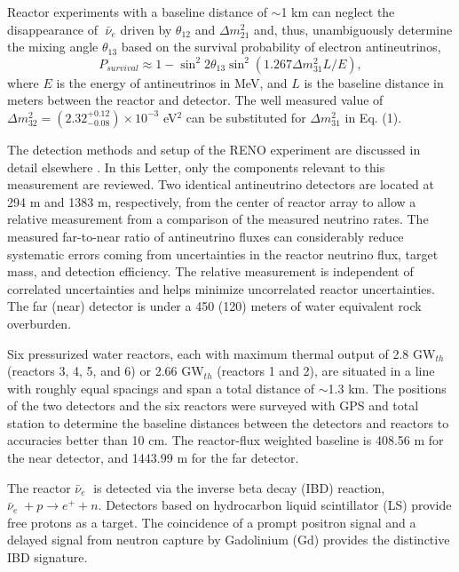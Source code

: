 \documentclass[aps,prl,twocolumn,superscriptaddress,showpacs]{revtex4-1}
\begin{document}
Reactor experiments with a baseline distance of $\sim$1 km can neglect the disappearance of $\bar{\nu}_e$ driven by $\theta_{12}$ and $\Delta m_{21}^2$ and, thus, unambiguously determine the mixing angle $\theta_{13}$ based on the survival probability of electron antineutrinos, 
\begin{equation}
 P_{survival} \approx 1- \sin^2 2 \theta_{13} \sin^2(1.267 \Delta m_{31}^2 L/E),           
\end{equation}
where $E$ is the energy of antineutrinos in MeV, and $L$ is the baseline distance in meters between the reactor and detector. The well measured value of $\Delta m_{32}^2 = (2.32_{-0.08}^{+0.12})\times 10^{-3}$ eV$^2$ \cite{ref_16} can be substituted for $\Delta m_{31}^2$ in Eq. (1). 


The detection methods and setup of the RENO experiment are discussed in detail elsewhere \cite{ref_17}. In this Letter, only the components relevant to this measurement are reviewed. Two identical antineutrino detectors are located at 294 m and 1383 m, respectively, from the center of reactor array to allow a relative measurement from a comparison of the measured neutrino rates. The measured far-to-near ratio of antineutrino fluxes can considerably reduce systematic errors coming from uncertainties in the reactor neutrino flux, target mass, and detection efficiency. The relative measurement is independent of correlated uncertainties and helps minimize uncorrelated reactor uncertainties. The far (near) detector is under a 450 (120) meters of water equivalent rock overburden.


Six pressurized water reactors, each with maximum thermal output of 2.8 GW$_{th}$ (reactors 3, 4, 5, and 6) or 2.66 GW$_{th}$ (reactors 1 and 2), are situated in a line with roughly equal spacings and span a total distance of $\sim$1.3 km. The positions of the two detectors and the six reactors were surveyed with GPS and total station to determine the baseline distances between the detectors and reactors to accuracies better than 10 cm. The reactor-flux weighted baseline is 408.56 m for the near detector, and 1443.99 m for the far detector. 

The reactor $\bar{\nu}_e$ is detected via the inverse beta decay (IBD) reaction, $\bar{\nu}_e + p \rightarrow e^+  + n$. Detectors based on hydrocarbon liquid scintillator (LS) provide free protons as a target. The coincidence of a prompt positron signal and a delayed signal from neutron capture by Gadolinium (Gd) provides the distinctive IBD signature.
\end{document}
